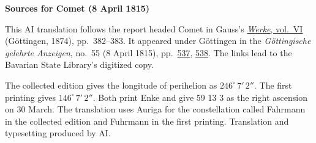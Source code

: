 \clearpage\thispagestyle{empty}
\begin{center}\textbf{Sources for Comet (8 April 1815)}\end{center}
\noindent This AI translation follows the report headed Comet in Gauss’s \href{https://gdz.sub.uni-goettingen.de/id/PPN236007467}{\textit{Werke}, vol.~VI} (Göttingen, 1874), pp.~382--383. It appeared under Göttingen in the \textit{Göttingische gelehrte Anzeigen}, no.~55 (8 April 1815), pp.~\href{https://api.digitale-sammlungen.de/iiif/image/v2/bsb10538686_00545/full/1600,/0/default.jpg}{537}, \href{https://api.digitale-sammlungen.de/iiif/image/v2/bsb10538686_00546/full/1600,/0/default.jpg}{538}. The links lead to the Bavarian State Library’s digitized copy.
\par\smallskip\noindent The collected edition gives the longitude of perihelion as $246^\circ\,7'\,2''$. The first printing gives $146^\circ\,7'\,2''$. Both print Enke and give 59 13 3 as the right ascension on 30 March. The translation uses Auriga for the constellation called Fahrmann in the collected edition and Fuhrmann in the first printing. Translation and typesetting produced by AI.
\clearpage
